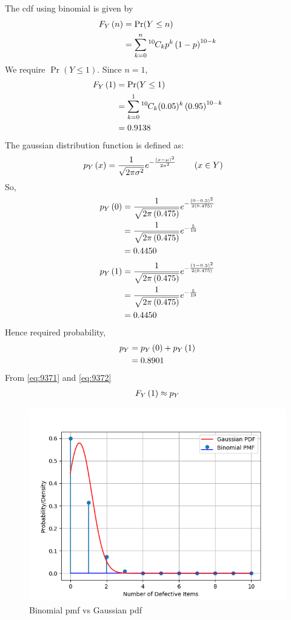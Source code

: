 \documentclass[]{article}
\begin{document}
The cdf using binomial is given by  
\begin{align}
	F_Y\left(n\right) &= \Pr(Y \leq n) \\
        &= \sum_{k=0}^n{{}^{10}\mkern-1muC_{k}}p^k\left(1-p\right)^{10-k}
\end{align}
We require $\Pr(Y \leq 1)$. Since $n = 1$,
\begin{align}
	F_Y\left(1\right) &= \Pr(Y \leq 1) \\
        &=  \sum_{k=0}^1{{}^{10}\mkern-1muC_{k}}(0.05)^k\left(0.95\right)^{10-k} \\
	&= 0.9138 
	\label{eq:9371}
\end{align} 
The gaussian distribution function is defined as:
\begin{align}
p_Y\left(x\right) &= \frac{1}{\sqrt{2\pi{\sigma}^2}} e^{-\frac{\left(x-\mu\right)^2}{2{\sigma}^2}}\label{9.3.8} \qquad \left(x \in Y\right)
\end{align}
So,
\begin{align}
p_Y\left(0\right) &= \frac{1}{\sqrt{2\pi\left(0.475\right)}} e^{-\frac{\left(0 - 0.5\right)^2}{2\left(0.475\right)}}\\
		   &= \frac{1}{\sqrt{2\pi\left(0.475\right)}} e^{-\frac{5}{19}}\\
	           &= 0.4450
\end{align}
\begin{align}
p_Y\left(1\right) &= \frac{1}{\sqrt{2\pi\left(0.475\right)}} e^{-\frac{\left(1 - 0.5\right)^2}{2\left(0.475\right)}}\\
		   &= \frac{1}{\sqrt{2\pi\left(0.475\right)}} e^{-\frac{5}{19}}\\
	           &= 0.4450
\end{align}
Hence required probability,
\begin{align}
	p_Y &= p_Y\left(0\right) + p_Y\left(1\right)\\
	    &= 0.8901
	    \label{eq:9372}
\end{align}
From \eqref{eq:9371} and \eqref{eq:9372}
\begin{align}
F_Y\left(1\right)\approx p_Y
\end{align}
\begin{figure}[!ht]
\includegraphics[width=\columnwidth]{./figs/fig.png}
\caption{Binomial pmf vs Gaussian pdf}
\label{fig:gaussian/9/3/7/}
\end{figure}
\end{document}
